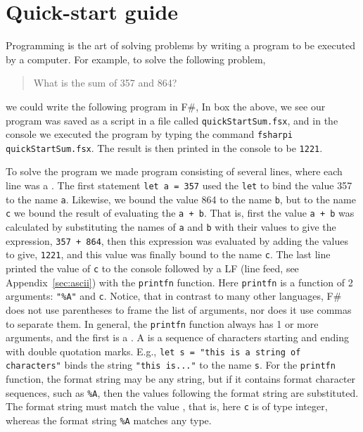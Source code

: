 \chapter{Quick-start guide}
Programming is the art of solving problems by writing a program to be executed by a computer. For example, to solve the following problem,
\begin{quote}
  What is the sum of 357 and 864?
\end{quote}
we could write the following program in F\#,
%
%
In box the above, we see our program was saved as a script in a file called \texttt{quickStartSum.fsx}, and in the console we executed the program by typing the command \lstinline|fsharpi quickStartSum.fsx|. The result is then printed in the console to be \texttt{1221}.

To solve the program we made program consisting of several lines, where each line was a . The first statement \lstinline|let a = 357| used the \lstinline|let|  to bind the value 357 to the name \lstinline|a|. Likewise, we bound the value 864 to the name \lstinline|b|, but to the name \lstinline|c| we bound the result of evaluating the  \lstinline|a + b|. That is, first the value \lstinline|a + b| was calculated by substituting the names of \lstinline|a| and \lstinline|b| with their values to give the expression, \lstinline|357 + 864|, then this expression was evaluated by adding the values to give, \lstinline|1221|, and this value was finally bound to the name \lstinline|c|. The last line printed the value of \lstinline|c| to the console followed by a LF (line feed, see Appendix~\ref{sec:ascii}) with the \lstinline|printfn| function. Here \lstinline|printfn| is a function of 2 arguments: \lstinline|"%A"| and \lstinline|c|. Notice, that in contrast to many other languages, F\# does not use parentheses to frame the list of arguments, nor does it use commas to separate them. In general, the \lstinline|printfn| function always has 1 or more arguments, and the first is a . A  is a sequence of characters starting and ending with double quotation marks. E.g.,  \lstinline|let s = "this is a string of characters"| binds the string \lstinline|"this is..."| to the name \lstinline|s|. For the \lstinline|printfn| function, the format string may be any string, but if it contains format character sequences, such as \lstinline|%A|, then the values following the format string are substituted. The format string must match the value , that is, here \lstinline|c| is of type integer, whereas the format string \lstinline|%A| matches any type.

